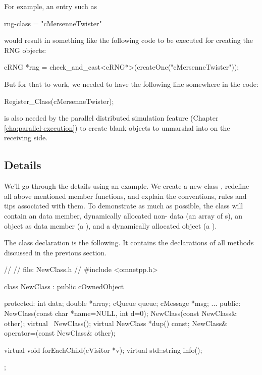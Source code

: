 For example, an  entry such as

\begin{inifile}
rng-class = "cMersenneTwister"
\end{inifile}

would result in something like the following code to be executed
for creating the RNG objects:

\begin{cpp}
cRNG *rng = check_and_cast<cRNG*>(createOne("cMersenneTwister"));
\end{cpp}

But for that to work, we needed to have the following line somewhere in the code:

\begin{cpp}
Register_Class(cMersenneTwister);
\end{cpp}

 is also needed by the parallel distributed simulation feature
(Chapter \ref{cha:parallel-execution}) to create blank objects to unmarshal into
on the receiving side.


\subsection{Details}

We'll go through the details using an example. We create a new
class , redefine all above mentioned 
member functions, and explain the conventions, rules and tips
associated with them.
To demonstrate as much as possible, the class will contain
an  data member, dynamically allocated non- data
(an array of s),
an {\opp} object as data member (a ), and
a dynamically allocated {\opp} object (a ).

The class declaration is the following. It contains the declarations
of all methods discussed in the previous section.

\begin{cpp}
//
// file: NewClass.h
//
#include <omnetpp.h>

class NewClass : public cOwnedObject
{
  protected:
    int data;
    double *array;
    cQueue queue;
    cMessage *msg;
    ...
  public:
    NewClass(const char *name=NULL, int d=0);
    NewClass(const NewClass& other);
    virtual ~NewClass();
    virtual NewClass *dup() const;
    NewClass& operator=(const NewClass& other);

    virtual void forEachChild(cVisitor *v);
    virtual std::string info();
};
\end{cpp}

